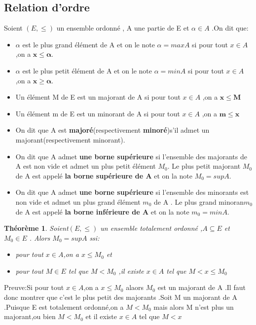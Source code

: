 \documentclass[a4paper,12pt]{article} %
\newtheorem{theoreme}{Théorème}[section]
\begin{document}
	\subsection{Relation d'ordre }
		Soient $(E,\leq)$ un ensemble ordonné , A une partie de E et $\alpha \in A$ .On dit que:
		\begin{itemize}
			\item $\alpha$ est le plus grand élément de A et on le note $\alpha=maxA$ si pour tout $x\in A$ ,on a $\boldsymbol{x\leq\alpha}$.
			\item $\alpha$ est le plus petit élément de A et on le note $\alpha=minA$ si pour tout $x\in A$,on a $\boldsymbol{x \geq\alpha}$.
			\item Un élément M de E est un majorant de A si pour tout $x\in A$ ,on a $\mathbf{x\leq M}$
            \item Un élément m de E est un minorant de A si pour tout $x\in A$ ,on a $\mathbf{m\leq x}$
            \item On dit que A est \textbf{majoré}(respectivement \textbf{minoré})s'il admet un majorant(respectivement minorant).
            \item On dit que A admet \textbf{une borne supérieure} si l'ensemble des majorants de A est non vide et admet un plus petit élément $M_0$. Le plus petit majorant $M_0$ de A est appelé \textbf{la borne supérieure de A} et on la note $M_0=supA$.
            \item On dit que A admet \textbf{une borne supérieure}
            si l'ensemble des minorants est non vide et admet un plus grand élément $m_0$ de A . Le plus grand minoran$m_0$ de A est appelé \textbf{la borne inférieure de A } et on la note $m_0=minA$.
         	\end{itemize}
            
		\begin{theoreme}
			Soient$(E,\leq)$ un ensemble totalement ordonné ,$A\subseteq E$ et $M_0 \in E$ .
			Alors $M_0=supA$ ssi:
			\begin{itemize}
				\item pour tout $x\in A$,on a $x\leq M_0$ et
				\item pour tout $M\in E$ tel que $M<M_0$ ,il existe $x\in A$ tel que $M<x\leq M_0$
			\end{itemize}
		\end{theoreme}
		Preuve:Si pour tout $x\in A$,on a $x\leq M_0$ alaors $M_0$ est un majorant de A .Il faut donc montrer que c'est le plus petit des majorants .Soit M un majorant de A .Puisque E est totalement ordonné,on a $M<M_0$ mais alors M n'est plus un majorant,ou bien $M<M_0$ et il existe $x\in A$ tel que $M<x$
		
\end{document}
